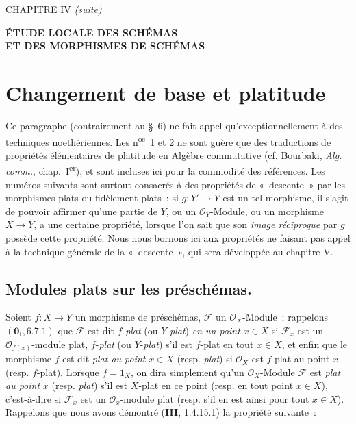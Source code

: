 \label{chapter:IV2-fr}

\begin{center}
{\large CHAPITRE IV \textit{(suite)}\par}
\vspace{1.5em}
{\Large\bfseries ÉTUDE LOCALE DES SCHÉMAS\\
ET DES MORPHISMES DE SCHÉMAS\par}
\end{center}

\setcounter{section}{1}
\section{Changement de base et platitude}
\label{section:IV.2-fr}

Ce paragraphe (contrairement au \S~6) ne fait appel qu'exceptionnellement à
des techniques noethériennes. Les n\textsuperscript{os}~1 et 2 ne sont guère
que des traductions de propriétés élémentaires de platitude en Algèbre
commutative (cf. Bourbaki, \emph{Alg. comm.}, chap.~I\textsuperscript{er}), et
sont incluses ici pour la commodité des références. Les numéros suivants sont
surtout consacrés à des propriétés de «~descente~» par les morphismes plats ou
fidèlement plats~: si $g:Y'\to Y$ est un tel morphisme, il s'agit de pouvoir
affirmer qu'une partie de $Y$, ou un $\mathcal O_Y$-Module, ou un morphisme
$X\to Y$, a une certaine propriété, lorsque l'on sait que son \emph{image
réciproque} par $g$ possède cette propriété. Nous nous bornons ici aux
propriétés ne faisant pas appel à la technique générale de la «~descente~»,
qui sera développée au chapitre V.

\setcounter{subsection}{0}
\subsection{Modules plats sur les préschémas.}
\label{subsection:IV.2.1-fr}

\begin{env}[2.1.1]
Soient $f:X\to Y$ un morphisme de préschémas, $\mathscr F$ un
$\mathcal O_X$-Module~; rappelons $(\mathbf{0}_{\mathrm I},6.7.1)$ que $\mathscr F$ est
dit $f$-\emph{plat} (ou $Y$-\emph{plat}) \emph{en un point} $x\in X$ si $\mathscr F_x$ est
un $\mathcal O_{f(x)}$-module plat, $f$-\emph{plat} (ou $Y$-\emph{plat}) s'il est $f$-plat
en tout $x\in X$, et enfin que le morphisme $f$ est dit \emph{plat au
point} $x\in X$ (resp. \emph{plat}) si $\mathcal O_X$ est $f$-plat au point $x$
(resp. $f$-plat). Lorsque $f=1_X$, on dira simplement qu'un
$\mathcal O_X$-Module $\mathscr F$ est \emph{plat au point} $x$ (resp. \emph{plat})
s'il est $X$-plat en ce point (resp. en tout point $x\in X$), c'est-à-dire si
$\mathscr F_x$ est un $\mathcal O_x$-module plat (resp. s'il en est ainsi pour
tout $x\in X$). Rappelons que nous avons démontré (\textbf{III}, 1.4.15.1) la propriété
suivante~:
\end{env}

